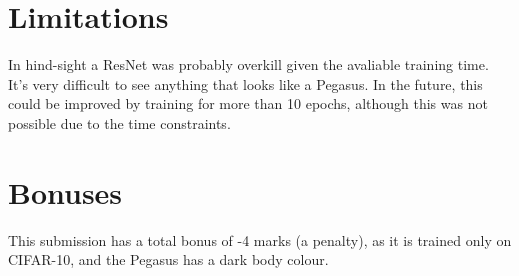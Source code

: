 \documentclass{article}
\begin{document}
\section{Limitations}
In hind-sight a ResNet was probably overkill given the avaliable training time.
It's very difficult to see anything that looks like a Pegasus. In the future, this could be improved by training for more than 10 epochs, although this was not possible due to the time constraints.

\section*{Bonuses}
This submission has a total bonus of -4 marks (a penalty), as it is trained only on CIFAR-10, and the Pegasus has a dark body colour.

\printbibliography
\end{document}
